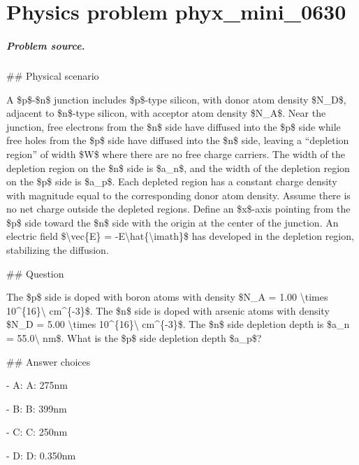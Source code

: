 
\chapter{Physics problem phyx\_mini\_0630}
\label{ch:PhyXMiniProblems_problem_phyx_mini_0630}

\paragraph{Problem source.}
\#\# Physical scenario

A \$p\$-\$n\$ junction includes \$p\$-type silicon, with donor atom density \$N\_D\$, adjacent to \$n\$-type silicon, with acceptor atom density \$N\_A\$. Near the junction, free electrons from the \$n\$ side have diffused into the \$p\$ side while free holes from the \$p\$ side have diffused into the \$n\$ side, leaving a “depletion region” of width \$W\$ where there are no free charge carriers. The width of the depletion region on the \$n\$ side is \$a\_n\$, and the width of the depletion region on the \$p\$ side is \$a\_p\$. Each depleted region has a constant charge density with magnitude equal to the corresponding donor atom density. Assume there is no net charge outside the depleted regions. Define an \$x\$-axis pointing from the \$p\$ side toward the \$n\$ side with the origin at the center of the junction. An electric field \$\textbackslash{}vec\{E\} = -E\textbackslash{}hat\{\textbackslash{}imath\}\$ has developed in the depletion region, stabilizing the diffusion.

\#\# Question

The \$p\$ side is doped with boron atoms with density \$N\_A = 1.00 \textbackslash{}times 10\textasciicircum{}\{16\}\textbackslash{} cm\textasciicircum{}\{-3\}\$. The \$n\$ side is doped with arsenic atoms with density \$N\_D = 5.00 \textbackslash{}times 10\textasciicircum{}\{16\}\textbackslash{} cm\textasciicircum{}\{-3\}\$. The \$n\$ side depletion depth is \$a\_n = 55.0\textbackslash{} nm\$. What is the \$p\$ side depletion depth \$a\_p\$?

\#\# Answer choices

- A: A: 275nm

- B: B: 399nm

- C: C: 250nm

- D: D: 0.350nm

